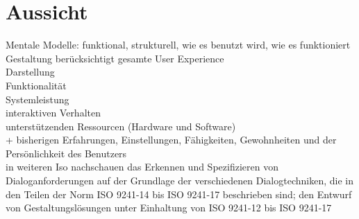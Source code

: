 
\section{Aussicht}
Mentale Modelle: funktional, strukturell, wie es benutzt wird, wie es funktioniert\\

Gestaltung berücksichtigt gesamte User Experience\\
 Darstellung\\
 Funktionalität\\
 Systemleistung\\
 interaktiven Verhalten\\
 unterstützenden Ressourcen (Hardware und Software)\\
 + bisherigen Erfahrungen, Einstellungen, Fähigkeiten, Gewohnheiten und der Persönlichkeit des Benutzers\\

 
in weiteren Iso nachschauen
 	das Erkennen und Spezifizieren von Dialoganforderungen auf der Grundlage der verschiedenen Dialogtechniken, die in den Teilen der Norm ISO 9241-14 bis ISO 9241-17 beschrieben sind;
 den Entwurf von Gestaltungslösungen unter Einhaltung von ISO 9241-12 bis ISO 9241-17\\